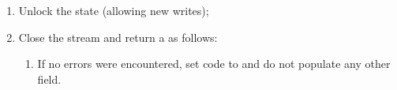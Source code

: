 \documentclass[11pt]{article}
\begin{document}
{\begin{enumerate}
\begin{enumerate}
\begin{enumerate}[noitemsep,topsep=\mdcompacttopsep]%

\item{}If the read was successful, return the entities read in
 stream.%

\item{}If the read failed (exception / critical-error), prepare a 
with code set to .%
\end{enumerate}%

\item{}
If the \emph{request} is invalid (invalid-argument, not-supported, etc.),
prepare a  with relevant canonical code to capture the error.%
\end{enumerate}%

\item{}
Unlock the state (allowing new writes);%

\item{}
Close the  stream and return a  as follows:%

\begin{enumerate}%

\item{}
If no errors were encountered, set code to  and do not populate any
other field.%


\end{enumerate}
\end{enumerate}}
\end{document}
